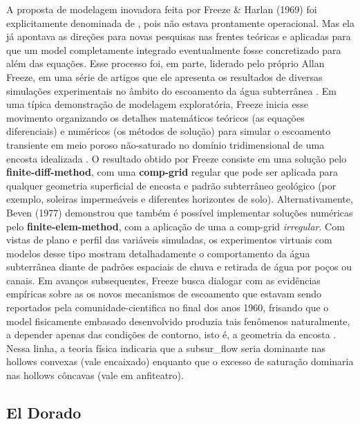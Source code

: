 \documentclass[./main.tex]{subfiles}
\begin{document}
\par A proposta de modelagem inovadora feita por Freeze \& Harlan (1969) foi explicitamente denominada de , pois não estava prontamente operacional. Mas ela já apontava as direções para novas pesquisas nas frentes teóricas e aplicadas para que um \gls{model} completamente integrado eventualmente fosse concretizado para além das equações. Esse processo foi, em parte, liderado pelo próprio Allan Freeze, em uma série de artigos que ele apresenta os resultados de diversas simulações experimentais no âmbito do escoamento da água subterrânea \cite{Freeze1974a}. Em uma típica demonstração de modelagem exploratória, Freeze inicia esse movimento organizando os detalhes matemáticos teóricos (as equações diferenciais) e numéricos (os métodos de solução) para simular o escoamento transiente em meio poroso não-saturado no domínio tridimensional de uma encosta idealizada \cite{Freeze1971a}. O resultado obtido por Freeze consiste em uma solução pelo \textbf{\gls{finite-diff-method}}, com uma \textbf{\gls{comp-grid}} regular que pode ser aplicada para qualquer geometria superficial de encosta e padrão subterrâneo geológico (por exemplo, soleiras impermeáveis e diferentes horizontes de solo). Alternativamente, Beven (1977) \cite{Beven1977a} demonstrou que também é possível implementar soluções numéricas pelo \textbf{\gls{finite-elem-method}}, com a aplicação de uma a \gls{comp-grid} \textit{irregular}. Com vistas de plano e perfil das variáveis simuladas, os experimentos virtuais com modelos desse tipo mostram detalhadamente o comportamento da água subterrânea diante de padrões espaciais de chuva e retirada de água por poços ou canais. Em avanços subsequentes, Freeze busca dialogar com as evidências empíricas sobre as os novos mecanismos de escoamento que estavam sendo reportados pela \gls{comunidade-cientifica} no final dos anos 1960, frisando que o \gls{model} fisicamente embasado desenvolvido produzia tais fenômenos naturalmente, a depender apenas das condições de contorno, isto é, a geometria da encosta \cite{Freeze1972a, Freeze1972b}. Nessa linha, a \gls{teoria} física indicaria que a \gls{subsur_flow} seria dominante nas \gls{hollows} convexas (vale encaixado) enquanto que o excesso de saturação dominaria nas \gls{hollows} côncavas (vale em anfiteatro). 

\subsection{El Dorado} \label{sec:hydro:broken}
\end{document}
